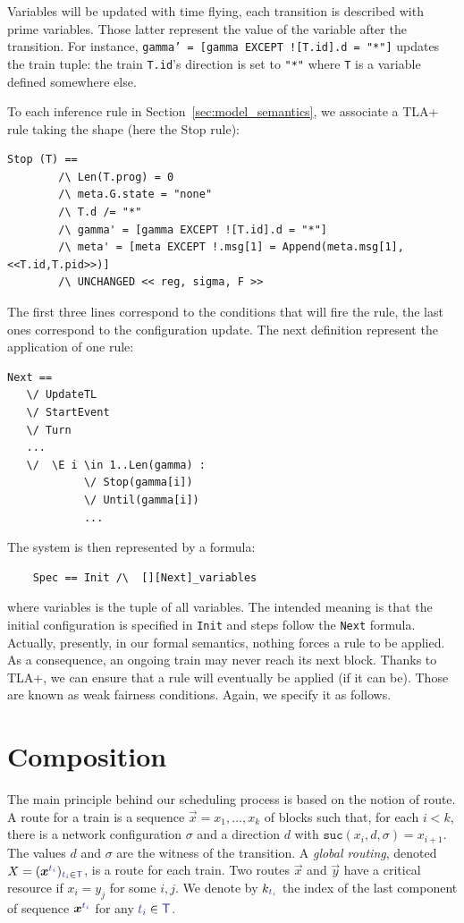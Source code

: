 \documentclass[runningheads]{llncs}
\newcommand{\sucblock}{{\mathtt{suc}}}
\newcommand{\trainFmt}[1]{{\color{traincolor} #1}}
\newcommand{\trains}{{\trainFmt{\mathsf{T}}}}
\newcommand{\tid}[1]{\ensuremath{\trainFmt{t_{#1}}}}
\begin{document}
Variables will be updated with time flying, each transition is described with prime variables. Those latter represent the value of the variable after the transition. For instance, \texttt{gamma' = [gamma EXCEPT ![T.id].d = "*"]} updates the train tuple: the train \texttt{T.id}'s direction is set to \texttt{"*"} where  \texttt{T} is a variable  defined somewhere else. 

To each inference rule in Section~\ref{sec:model_semantics}, we associate a TLA+ rule taking the shape (here the Stop rule): 
\begin{verbatim}
Stop (T) ==
        /\ Len(T.prog) = 0
        /\ meta.G.state = "none"
        /\ T.d /= "*"
        /\ gamma' = [gamma EXCEPT ![T.id].d = "*"]
        /\ meta' = [meta EXCEPT !.msg[1] = Append(meta.msg[1],<<T.id,T.pid>>)]
        /\ UNCHANGED << reg, sigma, F >>
 \end{verbatim}
The first three lines correspond to the conditions that will fire the rule, the last ones correspond to the configuration update. The next definition represent the application of one rule:
\begin{verbatim}
Next == 
   \/ UpdateTL
   \/ StartEvent
   \/ Turn
   ...
   \/  \E i \in 1..Len(gamma) :
            \/ Stop(gamma[i])
            \/ Until(gamma[i])
            ...
\end{verbatim}       
        
The system is then represented by a formula:
\begin{verbatim}
    Spec == Init /\  [][Next]_variables
\end{verbatim}%
where variables is the tuple of all variables. The intended meaning is that the initial configuration is specified in \texttt{Init} and steps follow the \texttt{Next} formula.  Actually, presently, in our formal semantics, nothing forces a rule to be applied. As a consequence, an ongoing train may never reach its next block. Thanks to TLA+, we can ensure that a rule will eventually be applied (if it can be). Those are known as weak fairness conditions. Again, we specify it as follows. %


\section{Composition}
\label{sec:composition}

The main principle behind our scheduling process is based on the notion of route. A route for a train is a sequence $\vec{x} = x_1, \ldots, x_k$ of blocks such that, for each $i < k$, there is a network configuration $\sigma$  and a direction $d$ with $\sucblock(x_i, d, \sigma) = x_{i+1}$.  The values $d$ and $\sigma$ are the witness of the transition. A \emph{global routing}, denoted $X = (\vec{x}^{\tid{i}})_{\tid{i} \in \trains}$, is a route for each train.  Two routes $\vec{x}$ and $\vec{y}$ have a critical resource if  $x_i = y_j$ for some $i,j$. We denote by $k_{\tid{i}}$ the index of the last component of sequence $\vec{x}^\tid{i}$ for any $\tid{i}\in \trains$. 
\end{document}
